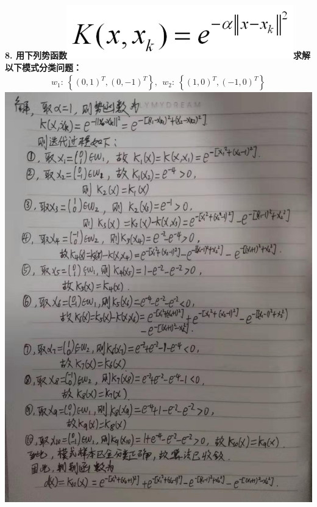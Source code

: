 \documentclass[a4paper, UTF8, 12pt]{ctexart}
\begin{document}
    \newpage
    \textbf{8. 用下列势函数\includegraphics[scale=0.5]{ass8.png}求解以下模式分类问题：}
    \begin{equation*}
        \begin{split}
            w_1: \ \left\{ {\left(0,1 \right)}^T, {\left(0,-1\right)}^T \right\}, \ \ 
            w_2: \ \left\{{\left(1,0\right)}^T, {\left(-1,0\right)}^T \right\}
        \end{split}
    \end{equation*}
    \includegraphics[scale=0.45]{asw8.jpg}
\end{document}
